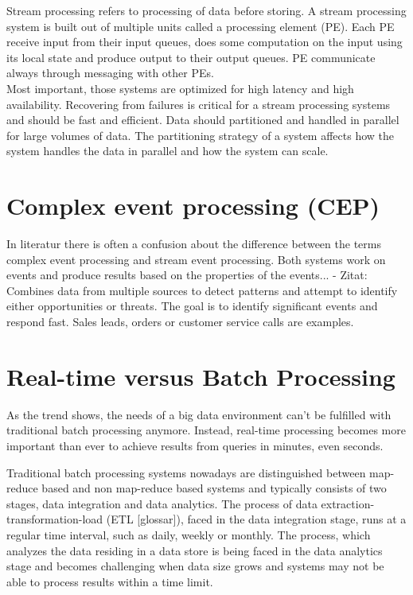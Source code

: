 Stream processing refers to processing of data before storing. 
A stream processing system is built out of multiple units called a processing
element (PE). Each PE receive input from their input queues, does some
computation on the input using its local state and produce output to their
output queues. PE communicate always through messaging with other PEs. 
\\
Most important, those systems are optimized for high latency and high
availability. Recovering from failures is critical for a stream processing
systems and should be fast and efficient. 
Data should partitioned and handled in parallel for large volumes of data. 
The partitioning strategy of a system  affects how the system
handles the data in parallel and how the system can scale. 



\section{Complex event processing (CEP)}
In literatur there is often a confusion about the difference between the terms
complex event processing and stream event processing. Both systems work on
events and produce results based on the properties of the events... 
- Zitat: Combines data from multiple sources  to detect patterns and attempt to
identify either opportunities or threats. The goal is to identify significant
events and respond fast. Sales leads, orders or customer service calls are
examples.\\


\section{Real-time versus Batch Processing}

As the trend shows, the needs of a big data environment can't be fulfilled with 
traditional batch processing anymore. Instead, real-time processing becomes more 
important than ever to achieve results from queries in minutes, even seconds. 
\cite{bange2013big}


Traditional batch processing systems nowadays are distinguished between
map-reduce based and non map-reduce based systems and typically consists of two
stages, data integration and data analytics. The process of data
extraction-transformation-load (ETL  [glossar]), faced in the data integration
stage, runs at a regular time interval, such as daily, weekly or monthly. The
process, which analyzes the data residing in a data store is being faced in the
data analytics stage and becomes challenging when data size grows and systems
may not be able to process results within a time limit.
\cite{Liu:2014:SRP:2628194.2628251}

